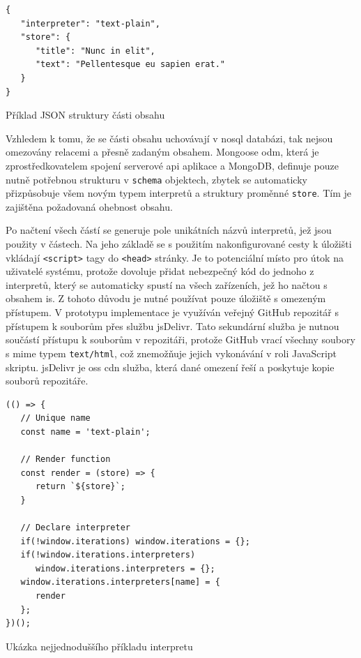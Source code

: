 \begin{fig:code}
	\begin{verbatim}
{
   "interpreter": "text-plain",
   "store": {
      "title": "Nunc in elit",
      "text": "Pellentesque eu sapien erat."
   }
}
   \end{verbatim}
   \caption{Příklad JSON struktury části obsahu}\label{listing:parts-json}
\end{fig:code}

Vzhledem k tomu, že se části obsahu uchovávají v \gls{nosql} databázi, tak nejsou omezovány relacemi a přesně zadaným obsahem. Mongoose \gls{odm}, která je zprostředkovatelem spojení serverové \gls{api} aplikace a MongoDB, definuje pouze nutně potřebnou strukturu v \texttt{schema} objektech, zbytek se automaticky přizpůsobuje všem novým typem interpretů a struktury proměnné \texttt{store}. Tím je zajištěna požadovaná ohebnost obsahu.

Po načtení všech částí se generuje pole unikátních názvů interpretů, jež jsou použity v částech. Na jeho základě se s použitím nakonfigurované cesty k úložišti vkládají \texttt{<script>} tagy do \texttt{<head>} stránky. Je to potenciální místo pro útok na uživatelé systému, protože dovoluje přidat nebezpečný kód do jednoho z interpretů, který se automaticky spustí na všech zařízeních, jež ho načtou s obsahem \gls{is}. Z tohoto důvodu je nutné používat pouze úložiště s omezeným přístupem. V prototypu implementace je využíván veřejný GitHub repozitář s přístupem k souborům přes službu jsDelivr. Tato sekundární služba je nutnou součástí přístupu k souborům v repozitáři, protože \mbox{GitHub} vrací všechny soubory s \gls{mime} typem \texttt{text/html}, což znemožňuje jejich vykonávání v roli JavaScript skriptu. jsDelivr je \gls{oss} \gls{cdn} služba, která dané omezení řeší a poskytuje kopie souborů repozitáře.

\begin{fig:code}
	\begin{verbatim}
(() => {
   // Unique name
   const name = 'text-plain';

   // Render function
   const render = (store) => {
      return `${store}`;
   }

   // Declare interpreter
   if(!window.iterations) window.iterations = {};
   if(!window.iterations.interpreters) 
      window.iterations.interpreters = {};
   window.iterations.interpreters[name] = {
      render
   };
})();
   \end{verbatim}
   \caption{Ukázka nejjednoduššího příkladu interpretu}\label{listing:interpret-js}
\end{fig:code}


